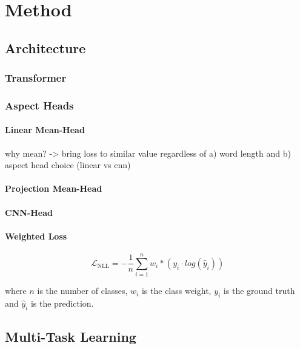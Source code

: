 \chapter{Method}
\label{ch:method}

\section{Architecture}

\subsection{Transformer}

\subsection{Aspect Heads}

\subsubsection{Linear Mean-Head}

why mean? -> bring loss to similar value regardless of a) word length and b) aspect head choice (linear vs cnn)

\subsubsection{Projection Mean-Head}

\subsubsection{CNN-Head}

\subsubsection*{Weighted Loss}

\begin{equation}
\mathcal{L}_\text{NLL}=-\frac{1}{n}\sum_{i=1}^{n} w_i * (y_i \cdot log(\hat{y}_i))
\label{eq:04_nll}
\end{equation}

where $n$ is the number of classes, $w_i$ is the class weight, $y_i$ is the ground truth and $\hat{y}_i$ is the prediction.

\section{Multi-Task Learning}

